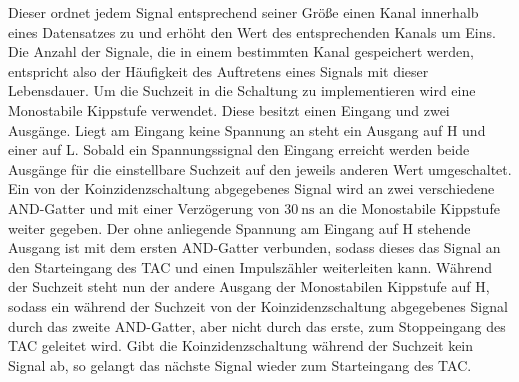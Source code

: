 Dieser ordnet jedem Signal entsprechend seiner Größe einen Kanal innerhalb eines Datensatzes zu und erhöht den Wert des entsprechenden Kanals um Eins.
Die Anzahl der Signale, die in einem bestimmten Kanal gespeichert werden, entspricht also der Häufigkeit des Auftretens eines Signals mit dieser Lebensdauer.
Um die Suchzeit in die Schaltung zu implementieren wird eine Monostabile Kippstufe verwendet.
Diese besitzt einen Eingang und zwei Ausgänge.
Liegt am Eingang keine Spannung an steht ein Ausgang auf H und einer auf L.
Sobald ein Spannungssignal den Eingang erreicht werden beide Ausgänge für die einstellbare Suchzeit auf den jeweils anderen Wert umgeschaltet.
Ein von der Koinzidenzschaltung abgegebenes Signal wird an zwei verschiedene AND-Gatter und mit einer Verzögerung von $\SI{30}{\nano\second}$ an die Monostabile Kippstufe weiter gegeben.
Der ohne anliegende Spannung am Eingang auf H stehende Ausgang ist mit dem ersten AND-Gatter verbunden, sodass dieses das Signal an den Starteingang des TAC und einen Impulszähler weiterleiten kann.
Während der Suchzeit steht nun der andere Ausgang der Monostabilen Kippstufe auf H, sodass ein während der Suchzeit von der Koinzidenzschaltung abgegebenes Signal durch das zweite AND-Gatter, aber nicht durch das erste, zum Stoppeingang des TAC geleitet wird.
Gibt die Koinzidenzschaltung während der Suchzeit kein Signal ab, so gelangt das nächste Signal wieder zum Starteingang des TAC.

\cite{sample}
